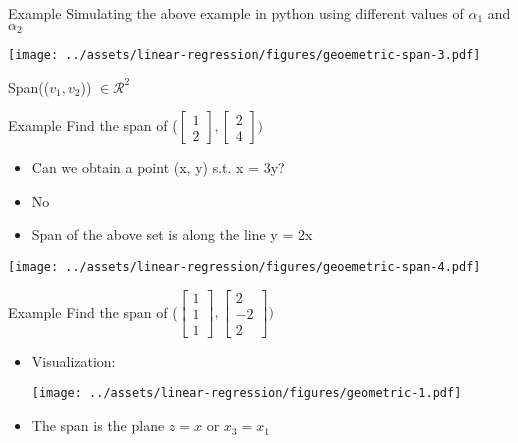 \documentclass{beamer}
\begin{document}
\begin{frame}{Example}
    Simulating the above example in python using different values of $\alpha_1$ and $\alpha_2$


    \texttt{[image: ../assets/linear-regression/figures/geoemetric-span-3.pdf]}
    
    Span(($v_1, v_2$)) $\in \mathcal{R}^2$
\end{frame}


\begin{frame}{Example}
Find the span of ($\begin{bmatrix}
1 \\2
\end{bmatrix}, \begin{bmatrix}
2 \\4
\end{bmatrix}) $

\begin{itemize}[<+->]
    \item Can we obtain a point (x, y) s.t. x = 3y?
    \item No
    \item Span of the above set is along the line y = 2x
\end{itemize}

\texttt{[image: ../assets/linear-regression/figures/geoemetric-span-4.pdf]}


\end{frame}

\begin{frame}{Example}
Find the span of ($\begin{bmatrix}
1 \\1\\1
\end{bmatrix}, \begin{bmatrix}
2 \\-2\\2
\end{bmatrix}) $
\begin{itemize}[<+->]
    \item Visualization:
        \begin{center}
        \texttt{[image: ../assets/linear-regression/figures/geometric-1.pdf]}
        \end{center}
    \item The span is the plane $z=x$ or $x_3=x_1$
\end{itemize}
\end{frame}
\end{document}
